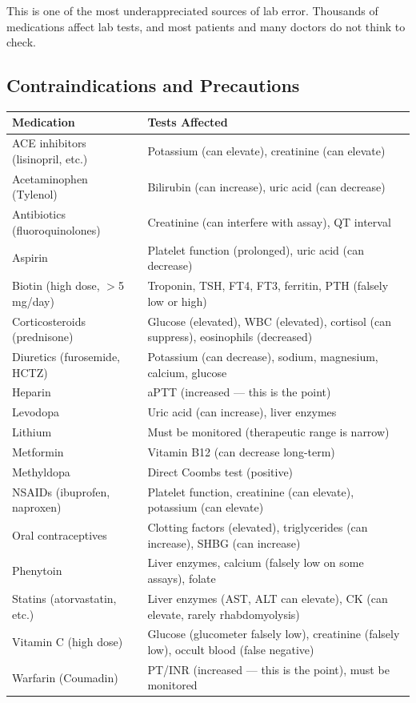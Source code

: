 This is one of the most underappreciated sources of lab error. Thousands of medications affect lab tests, and most patients and many doctors do not think to check.

\subsection{Contraindications and Precautions}

\begin{longtable}{@{}ll@{}}
\toprule
\textbf{Medication} & \textbf{Tests Affected} \\
\midrule
ACE inhibitors (lisinopril, etc.) & Potassium (can elevate), creatinine (can elevate) \\
Acetaminophen (Tylenol) & Bilirubin (can increase), uric acid (can decrease) \\
Antibiotics (fluoroquinolones) & Creatinine (can interfere with assay), QT interval \\
Aspirin & Platelet function (prolonged), uric acid (can decrease) \\
Biotin (high dose, $>$5 mg/day) & Troponin, TSH, FT4, FT3, ferritin, PTH (falsely low or high) \\
Corticosteroids (prednisone) & Glucose (elevated), WBC (elevated), cortisol (can suppress), eosinophils (decreased) \\
Diuretics (furosemide, HCTZ) & Potassium (can decrease), sodium, magnesium, calcium, glucose \\
Heparin & aPTT (increased --- this is the point) \\
Levodopa & Uric acid (can increase), liver enzymes \\
Lithium & Must be monitored (therapeutic range is narrow) \\
Metformin & Vitamin B12 (can decrease long-term) \\
Methyldopa & Direct Coombs test (positive) \\
NSAIDs (ibuprofen, naproxen) & Platelet function, creatinine (can elevate), potassium (can elevate) \\
Oral contraceptives & Clotting factors (elevated), triglycerides (can increase), SHBG (can increase) \\
Phenytoin & Liver enzymes, calcium (falsely low on some assays), folate \\
Statins (atorvastatin, etc.) & Liver enzymes (AST, ALT can elevate), CK (can elevate, rarely rhabdomyolysis) \\
Vitamin C (high dose) & Glucose (glucometer falsely low), creatinine (falsely low), occult blood (false negative) \\
Warfarin (Coumadin) & PT/INR (increased --- this is the point), must be monitored \\
\bottomrule
\end{longtable}

